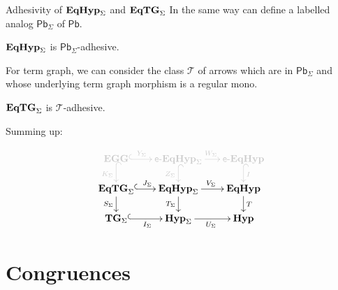 \documentclass[aspectratio=169]{beamer}
\newcommand{\catname}[1]{\textbf{\textup{#1}}}
\newcommand{\tg}[0]{\catname{TG}_{\Sigma}}
\newcommand{\eg}{\catname{EGG}}
\newcommand{\egg}{\mathsf{e}\text{-}\catname{EqHyp}}
\newcommand{\hyp}{\catname{Hyp}}
\newcommand{\EqHyp}{\catname{EqHyp}} %
\newcommand{\EqTG}{\catname{EqTG}}
\newcommand{\pbc}{\mathsf{Pb}}
\begin{document}
\begin{frame}{Adhesivity of $\EqHyp_\Sigma$ and $\EqTG_{\Sigma}$}
	In the same way can define a labelled analog $\pbc_\Sigma$ of $\pbc$.
	\pause 
	\begin{theorem}
		$\EqHyp_\Sigma$ is $\pbc_\Sigma$-adhesive.
	\end{theorem} 
	
	\pause 
	For term graph, we can consider the class $\mathcal{T}$ of arrows which are in $\pbc_\Sigma$ and whose underlying term graph morphism is a regular mono.
	
	\pause 
	\begin{theorem}
		$\EqTG_{\Sigma}$ is $\mathcal{T}$-adhesive.
	\end{theorem}
	
	
\end{frame}



\begin{frame}
	
	Summing up:
	
	
	\[\xymatrix@R=15pt@C=15pt{ \color{shaded}\eg \ar@{^{(}->}@[shaded][r]^-{\color{shaded}Y_\Sigma} \ar@{^{(}->}@[shaded][d]_{\color{shaded}K_\Sigma} & \color{shaded}\egg_\Sigma \ar@{^{(}->}@[shaded][d]_{\color{shaded} Z_\Sigma} \ar@[shaded][r]^{\color{shaded}W_\Sigma}&\color{shaded} \egg \ar@{^{(}->}@[shaded][d]^{\color{shaded}I}\\ \EqTG_{\Sigma} \ar@{^{(}->}[r]^{J_\Sigma}\ar[d]_{S_\Sigma}& \EqHyp_\Sigma \ar[r]^{V_\Sigma} \ar[d]_{T_\Sigma}& \EqHyp \ar[d]^{T}\\ \tg \ar@{^{(}->}[r]_{I_\Sigma}& \hyp_{\Sigma} \ar[r]_{U_\Sigma}  &\hyp}\]
	
\end{frame}

\section{Congruences}
\end{document}
